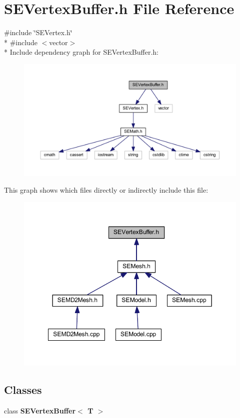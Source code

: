 \section{S\+E\+Vertex\+Buffer.\+h File Reference}
\label{_s_e_vertex_buffer_8h}
{\ttfamily \#include \char`\"{}S\+E\+Vertex.\+h\char`\"{}}\\*
{\ttfamily \#include $<$vector$>$}\\*
Include dependency graph for S\+E\+Vertex\+Buffer.\+h\+:
\nopagebreak
\begin{figure}[H]
\begin{center}
\leavevmode
\includegraphics[width=350pt]{_s_e_vertex_buffer_8h__incl}
\end{center}
\end{figure}
This graph shows which files directly or indirectly include this file\+:
\nopagebreak
\begin{figure}[H]
\begin{center}
\leavevmode
\includegraphics[width=349pt]{_s_e_vertex_buffer_8h__dep__incl}
\end{center}
\end{figure}
\subsection*{Classes}
\begin{DoxyCompactItemize}
\item 
class {\bf S\+E\+Vertex\+Buffer$<$ T $>$}
\end{DoxyCompactItemize}
